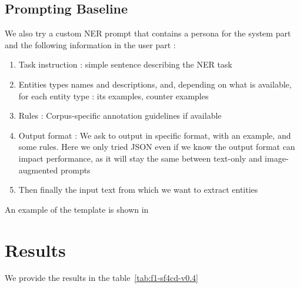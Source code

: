 \documentclass[11pt]{article}
\begin{document}
\subsection{Prompting Baseline}

We also try a custom NER prompt that contains a persona for the system part and the following information in the user part : 
\begin{enumerate}
    \item Task instruction : simple sentence describing the NER task
    \item Entities types names and descriptions, and, depending on what is available, for each entity type : its examples, counter examples
    \item Rules : Corpus-specific annotation guidelines if available
    \item Output format : We ask to output in specific format, with an example, and some rules. Here we only tried JSON even if we know the output format can impact performance, as it will stay the same between text-only and image-augmented prompts
    \item Then finally the input text from which we want to extract entities
\end{enumerate}

An example of the template is shown in 


\section{Results}

We provide the results in the table~\ref{tab:f1-sf4cd-v0.4}
\begin{table}[t]
\caption{F1 scores on sf4cd-v0.4 (Partial, Strict). Best per metric in bold, second-best underlined.}
\label{tab:f1-sf4cd-v0.4}
\end{table}
\end{document}
